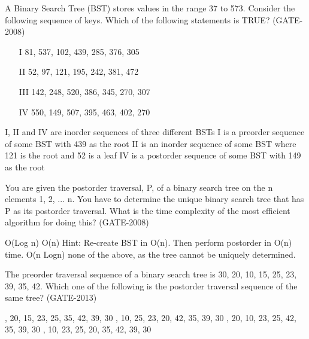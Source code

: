 \begin{questyle}
  \question  A Binary Search Tree (BST) stores values in the range 37 to 573. Consider the following
             sequence of keys. Which of the following statements is TRUE? (GATE-2008)
    \begin{enumerate}
    \item[I] 81, 537, 102, 439, 285, 376, 305
    \item[II] 52, 97, 121, 195, 242, 381, 472
    \item[III] 142, 248, 520, 386, 345, 270, 307
    \item[IV] 550, 149, 507, 395, 463, 402, 270
    \end{enumerate}

  \begin{choices}
    \choice         I, II and IV are inorder sequences of three different BSTs
    \choice         I is a preorder sequence of some BST with 439 as the root
    \CorrectChoice  II is an inorder sequence of some BST where 121 is the root and 52 is a leaf
    \choice         IV is a postorder sequence of some BST with 149 as the root
  \end{choices}
\end{questyle}

\begin{questyle}
  \question  You are given the postorder traversal, P, of a binary search tree on the n elements
             1, 2, ... n. You have to determine the unique binary search tree that has P as its postorder
             traversal. What is the time complexity of the most efficient algorithm for doing this?  (GATE-2008)

  \begin{choices}
    \choice         O(Log n)
    \CorrectChoice  O(n) \qquad Hint: Re-create BST in O(n). Then perform postorder in O(n) time.
    \choice         O(n Logn)
    \choice         none of the above, as the tree cannot be uniquely determined.
  \end{choices}
\end{questyle}

\begin{questyle}
  \question  The preorder traversal sequence of a binary search tree is 30, 20, 10, 15, 25, 23, 39, 35, 42.
            Which one of the following is the postorder traversal sequence of the same tree?  (GATE-2013)

  \begin{choices}
    , 20, 15, 23, 25, 35, 42, 39, 30
    , 10, 25, 23, 20, 42, 35, 39, 30
    , 20, 10, 23, 25, 42, 35, 39, 30
    , 10, 23, 25, 20, 35, 42, 39, 30
  \end{choices}
\end{questyle}


